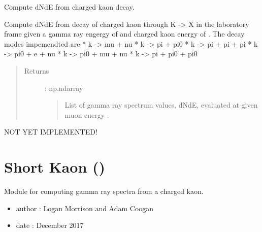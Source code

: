 \documentclass[letterpaper,10pt,english]{sphinxmanual}
\begin{document}
\begin{fulllineitems}
Compute dNdE from charged kaon decay.

Compute dNdE from decay of charged kaon through K -\textgreater{} X in the
laboratory frame given a gamma ray engergy of  and charged
kaon energy of . The decay modes impemendted are
* k -\textgreater{} mu  + nu
* k -\textgreater{} pi  + pi0
* k -\textgreater{} pi  + pi  + pi
* k -\textgreater{} pi0 + e   + nu
* k -\textgreater{} pi0 + mu  + nu
* k -\textgreater{} pi  + pi0 + pi0
\begin{quote}\begin{description}
\item[{Returns}] \leavevmode
{} : np.ndarray
\begin{quote}

List of gamma ray spectrum values, dNdE, evaluated at 
given muon energy .
\end{quote}

\end{description}\end{quote}

\end{fulllineitems}


\begin{fulllineitems}
NOT YET IMPLEMENTED!

\end{fulllineitems}



\section{Short Kaon ()}
\label{\detokenize{modules:short-kaon-hazma-short-kaon}}\label{\detokenize{modules:module-hazma.charged_kaon}}
Module for computing gamma ray spectra from a charged kaon.
\begin{itemize}
\item {} 
author : Logan Morrison and Adam Coogan

\item {} 
date : December 2017

\end{itemize}
\end{document}
